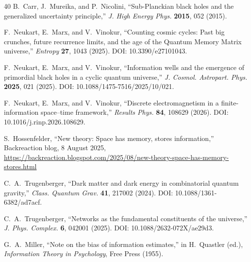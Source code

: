 ﻿\documentclass[12pt,a4paper]{article}
\begin{document}
\begin{thebibliography}{40}
B.~Carr, J.~Mureika, and P.~Nicolini,
``Sub-Planckian black holes and the generalized uncertainty principle,''
\textit{J. High Energy Phys.} \textbf{2015}, 052 (2015).

F.~Neukart, E.~Marx, and V.~Vinokur,
``Counting cosmic cycles: Past big crunches, future recurrence limits, and the age of the Quantum Memory Matrix universe,''
\textit{Entropy} \textbf{27}, 1043 (2025).
DOI: 10.3390/e27101043.

F.~Neukart, E.~Marx, and V.~Vinokur,
``Information wells and the emergence of primordial black holes in a cyclic quantum universe,''
\textit{J. Cosmol. Astropart. Phys.} \textbf{2025}, 021 (2025).
DOI: 10.1088/1475-7516/2025/10/021.

F.~Neukart, E.~Marx, and V.~Vinokur,
``Discrete electromagnetism in a finite-information space--time framework,''
\textit{Results Phys.} \textbf{84}, 108629 (2026).
DOI: 10.1016/j.rinp.2026.108629.

S.~Hossenfelder,
``New theory: Space has memory, stores information,''
Backreaction blog, 8 August 2025,
\url{https://backreaction.blogspot.com/2025/08/new-theory-space-has-memory-stores.html}

C.~A.~Trugenberger,
``Dark matter and dark energy in combinatorial quantum gravity,''
\textit{Class. Quantum Grav.} \textbf{41}, 217002 (2024).
DOI: 10.1088/1361-6382/ad7acf.

C.~A.~Trugenberger,
``Networks as the fundamental constituents of the universe,''
\textit{J. Phys. Complex.} \textbf{6}, 042001 (2025).
DOI: 10.1088/2632-072X/ae29d3.

G.~A.~Miller,
``Note on the bias of information estimates,''
in H.~Quastler (ed.), \textit{Information Theory in Psychology}, Free Press (1955).

\end{thebibliography}
\end{document}
